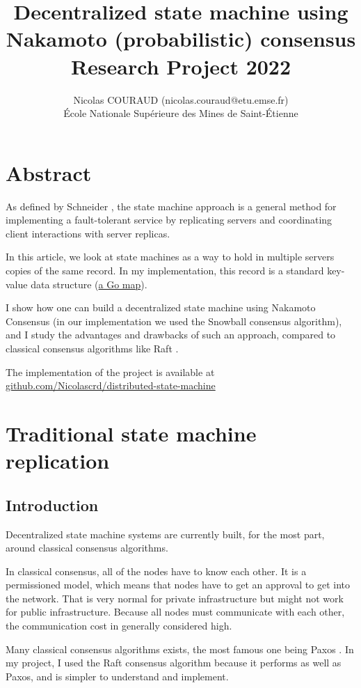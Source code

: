 \documentclass[11pt, twocolumn]{article}
\title{Decentralized state machine using Nakamoto (probabilistic) consensus\\\medskip Research Project 2022}
\author{Nicolas COURAUD (nicolas.couraud@etu.emse.fr)\\École Nationale Supérieure des Mines de Saint-Étienne}
\begin{document}
\maketitle
\onecolumn
\section*{Abstract}

As defined by Schneider \cite{stateMachine}, the state machine approach is a general method for implementing a fault-tolerant service
by replicating servers and coordinating client interactions with server replicas.

In this article, we look at state machines as a way to hold in multiple servers copies of the same record. In my implementation, this record is a standard
key-value data structure (\href{https://go.dev/blog/maps}{a Go map}).

I show how one can build a decentralized state machine using Nakamoto Consensus (in our implementation we used the Snowball consensus algorithm), and I study the advantages
and drawbacks of such an approach, compared to classical consensus algorithms like Raft \cite{understandable}.

The implementation of the project is available at \href{https://github.com/Nicolascrd/distributed-state-machine}{github.com/Nicolascrd/distributed-state-machine}


\tableofcontents

\section{Traditional state machine replication}

\subsection{Introduction}

Decentralized state machine systems are currently built, for the most part, around classical consensus algorithms.

In classical consensus, all of the nodes have to know each other. It is a permissioned model, which means that nodes have to get an approval to get into the network.
That is very normal for private infrastructure but might not work for public infrastructure. Because all nodes must communicate with each other, the communication cost in generally considered high.

Many classical consensus algorithms exists, the most famous one being Paxos \cite{parliament}. In my project, I used the Raft consensus algorithm \cite{understandable} because it performs as well as Paxos, and is simpler to understand and implement.
\end{document}
